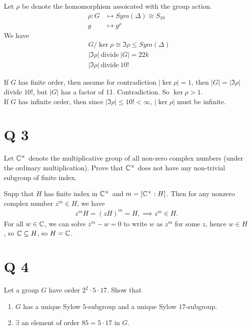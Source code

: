 \documentclass[12pt,english]{article}
\begin{document}
Let $\rho$ be denote the homomorphism assoicated with the group action.
\begin{align*}
    \rho: G &\mapsto Sym(\Delta) \cong S_{10}\\
    g &\mapsto g^{\rho}
\end{align*}
We have
\begin{align*}
    &G/\ker \rho \cong \Im \rho \leq Sym (\Delta) \\
    & |\Im \rho| \ \text{divide} \ |G| = 22k\\
    & |\Im \rho| \ \text{divide} \ 10!
\end{align*}

If $G$ has finite order, then assume for contradiction $|\ker \rho | =1$, then $|G| = |\Im \rho|$ divide $10!$, but $|G|$ has a factor of 11. Contradiction. So $\ker \rho >1$. \\

If $G$ has infinite order, then since $|\Im \rho| \leq 10! < \infty$, $|\ker \rho|$ must be infinite. 


\section*{Q 3}
\begin{question}
Let $\mathbb{C}^{\times}$ denote the multiplicative group of all non-zero complex numbers (under the ordinary multiplication). Prove that $\mathbb{C}^{\times}$ does not have any non-trivial subgroup of finite index.
\end{question}
Supp that $H$ has finite index in $\mathbb{C}^{\times}$ and $m = [\mathbb{C}^{\times}:H]$. Then for any nonzero complex number $z^m \in H$, we have
\begin{align*}
    z^m H = (zH)^m = H, \implies z^m \in H.
\end{align*} For all $w \in \mathbb{C}$, we can solve $z^m -w =0$ to write $w$ as $z^m$ for some $z$, hence $w\in H$, so $\mathbb{C} \subseteq H$, so $H = \mathbb{C}$. 


\section*{Q 4}
\begin{proposition}
Let a group $G$ have order $2^2 \cdot 5 \cdot 17$. Show that 
\begin{enumerate}
    \item $G$ has a unique Sylow $5$-subgroup and a unique Sylow $17$-subgroup.
    \item $\exists$ an element of order $85 = 5 \cdot 17$ in $G$.
\end{enumerate}

\end{proposition}
\end{document}
